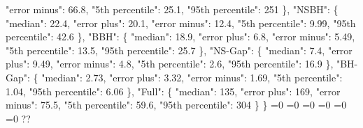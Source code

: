 {{        "error minus": 66.8, %
        "5th percentile": 25.1, %
        "95th percentile": 251%
      \}, %
      "NSBH": \{%
        "median": 22.4, %
        "error plus": 20.1, %
        "error minus": 12.4, %
        "5th percentile": 9.99, %
        "95th percentile": 42.6%
      \}, %
      "BBH": \{%
        "median": 18.9, %
        "error plus": 6.8, %
        "error minus": 5.49, %
        "5th percentile": 13.5, %
        "95th percentile": 25.7%
      \}, %
      "NS{-}Gap": \{%
        "median": 7.4, %
        "error plus": 9.49, %
        "error minus": 4.8, %
        "5th percentile": 2.6, %
        "95th percentile": 16.9%
      \}, %
      "BH{-}Gap": \{%
        "median": 2.73, %
        "error plus": 3.32, %
        "error minus": 1.69, %
        "5th percentile": 1.04, %
        "95th percentile": 6.06%
      \}, %
      "Full": \{%
        "median": 135, %
        "error plus": 169, %
        "error minus": 75.5, %
        "5th percentile": 59.6, %
        "95th percentile": 304%
      \}%
    \}}%
  \else%
    \ifnum{}=0%
      \let\FullPopNoDip@I@out\FullPopNoDip@III%
    \else%
      \ifnum{}=0%
      \let\FullPopNoDip@I@out\FullPopNoDip@IV%
    \else%
      \ifnum{}=0%
      \let\FullPopNoDip@I@out\FullPopNoDip@V%
    \else%
      \ifnum{}=0%
      \let\FullPopNoDip@I@out\FullPopNoDip@VI%
    \else%
      \ifnum{}=0%
      \let\FullPopNoDip@I@out\FullPopNoDip@VII%
    \else%
      \ifnum{}=0%
      \let\FullPopNoDip@I@out\FullPopNoDip@VIII%
    \else%
      \def\FullPopNoDip@I@out{%
    ??}%
    \fi\fi\fi\fi\fi\fi
  \fi
  \FullPopNoDip@I@out
}\newcommand\FullPopNoDip@II[1][all]{%
  \ifnum\pdfstrcmp{#1}{all}=0%
    \def\FullPopNoDip@II@out{%
    \{%
      "OneMsun": \{%
        "median": 1.23, %
        "error plus": 0.12, %
        "error minus": 0.155, %
        "5th percentile": 1.08, %
        "95th percentile": 1.35%
      \}, %
      "TenMsun": \{%
        "median": 9.18, %
        "error plus": 0.31, %
        "error minus": 0.41, %
        "5th percentile": 8.77, %
        "95th percentile": 9.49%
      \}, %
      "ThirtyMsun": \{%
        "median": 25.9, %
        "error plus": 13.9, %
        "error minus": 7.49, %
        "5th percentile": 18.4, %
        "95th percentile": 39.8%
      \}%
    \}}%
  \else%
    \ifnum\pdfstrcmp{#1}{OneMsun}=0%
      \let\FullPopNoDip@II@out\FullPopNoDip@IX%
    \else%
      \ifnum\pdfstrcmp{#1}{TenMsun}=0%
      \let\FullPopNoDip@II@out\FullPopNoDip@X%
    \else%
      \ifnum\pdfstrcmp{#1}{ThirtyMsun}=0%
}
